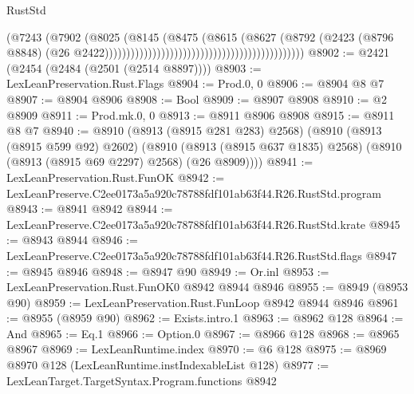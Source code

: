 \begin{lexlean}{RustStd}
\begin{coremodule}
                                                                            (@7243
                                                                              (@7902
                                                                                (@8025
                                                                                  (@8145
                                                                                    (@8475
                                                                                      (@8615
                                                                                        (@8627
                                                                                          (@8792
                                                                                            (@2423
                                                                                              (@8796
                                                                                                @8848)
                                                                                              (@26
                                                                                                @2422))))))))))))))))))))))))))))))))))))))))))))))
@8902 := @2421 (@2454 (@2484 (@2501 (@2514 @8897))))
@8903 := LexLeanPreservation.Rust.Flags
@8904 := Prod.{0, 0}
@8906 := @8904 @8 @7
@8907 := @8904 @8906
@8908 := Bool
@8909 := @8907 @8908
@8910 := @2 @8909
@8911 := Prod.mk.{0, 0}
@8913 := @8911 @8906 @8908
@8915 := @8911 @8 @7
@8940 := @8910
    (@8913 (@8915 @281 @283) @2568)
    (@8910
      (@8913 (@8915 @599 @92) @2602)
      (@8910 (@8913 (@8915 @637 @1835) @2568) (@8910 (@8913 (@8915 @69 @2297) @2568) (@26 @8909))))
@8941 := LexLeanPreservation.Rust.FunOK
@8942 := LexLeanPreserve.C2ee0173a5a920c78788fdf101ab63f44.R26.RustStd.program
@8943 := @8941 @8942
@8944 := LexLeanPreserve.C2ee0173a5a920c78788fdf101ab63f44.R26.RustStd.krate
@8945 := @8943 @8944
@8946 := LexLeanPreserve.C2ee0173a5a920c78788fdf101ab63f44.R26.RustStd.flags
@8947 := @8945 @8946
@8948 := @8947 @90
@8949 := Or.inl
@8953 := LexLeanPreservation.Rust.FunOK0 @8942 @8944 @8946
@8955 := @8949 (@8953 @90)
@8959 := LexLeanPreservation.Rust.FunLoop @8942 @8944 @8946
@8961 := @8955 (@8959 @90)
@8962 := Exists.intro.{1}
@8963 := @8962 @128
@8964 := And
@8965 := Eq.{1}
@8966 := Option.{0}
@8967 := @8966 @128
@8968 := @8965 @8967
@8969 := LexLeanRuntime.index
@8970 := @6 @128
@8975 := @8969 @8970 @128 (LexLeanRuntime.instIndexableList @128)
@8977 := LexLeanTarget.TargetSyntax.Program.functions @8942

\end{coremodule}
\end{lexlean}

